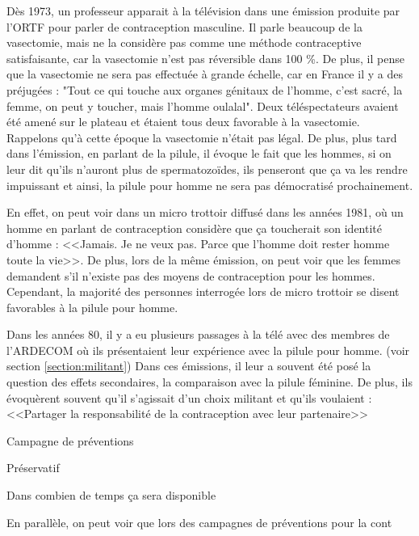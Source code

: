 \documentclass[12pt,a4paper]{report}
\begin{document}
Dès 1973, un professeur apparait à la télévision dans une émission produite par l'ORTF pour parler de contraception masculine. Il parle beaucoup de la vasectomie, mais ne la considère pas comme une méthode contraceptive satisfaisante, car la vasectomie n'est pas réversible dans 100 \%. De plus, il pense que la vasectomie ne sera pas effectuée à grande échelle, car en France il y a des préjugées : "Tout ce qui touche aux organes génitaux de l'homme, c'est sacré, la femme, on peut y toucher, mais l'homme oulalal". Deux téléspectateurs avaient été amené sur le plateau et étaient tous deux favorable à la vasectomie. \cite{ProfesseurNetterContraception} Rappelons qu'à cette époque la vasectomie n'était pas légal. \cite{guillaumedaudinContraceptesEnqueteDernier2022} De plus, plus tard dans l'émission, en parlant de la pilule, il évoque le fait que les hommes, si on leur dit qu'ils n'auront plus de spermatozoïdes, ils penseront que ça va les rendre impuissant et ainsi, la pilule pour homme ne sera pas démocratisé prochainement. \cite{inaactuPilulePourHomme2019}

En effet, on peut voir dans un micro trottoir diffusé dans les années 1981, où un homme en parlant de contraception considère que ça toucherait son identité d'homme : <<Jamais. Je ne veux pas. Parce que l'homme doit rester homme toute la vie>>. De plus, lors de la même émission, on peut voir que les femmes demandent s'il n'existe pas des moyens de contraception pour les hommes. Cependant, la majorité des personnes interrogée lors de micro trottoir se disent favorables à la pilule pour homme. \cites{MicrotrottoirHommesPour}{PilulePourHomme}

Dans les années 80, il y a eu plusieurs passages à la télé avec des membres de l'ARDECOM où ils présentaient leur expérience avec la pilule pour homme. (voir section \ref{section:militant}) Dans ces émissions, il leur a souvent été posé la question des effets secondaires, la comparaison avec la pilule féminine. De plus, ils évoquèrent souvent qu'il s'agissait d'un choix militant et qu'ils voulaient : <<Partager la responsabilité de la contraception avec leur partenaire>> \cites{inaactuPilulePourHomme2019}{1980HommeVient}

Campagne de préventions

Préservatif

Dans combien de temps ça sera disponible

En parallèle, on peut voir que lors des campagnes de préventions pour la cont
\end{document}
